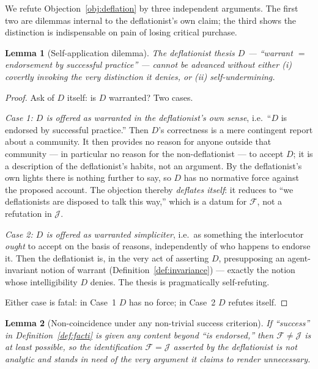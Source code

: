 \documentclass{amsart}
\theoremstyle{definition}
\theoremstyle{plain}
\newtheorem{lemma}{Lemma}
\begin{document}
We refute Objection~\ref{obj:deflation} by three independent arguments. The
first two are dilemmas internal to the deflationist's own claim; the third
shows the distinction is indispensable on pain of losing critical purchase.

\begin{lemma}[Self-application dilemma]\label{lem:selfapp}
The deflationist thesis $D$ --- ``warrant $=$ endorsement by successful
practice'' --- cannot be advanced without either (i) covertly invoking the very
distinction it denies, or (ii) self-undermining.
\end{lemma}

\begin{proof}
Ask of $D$ itself: is $D$ warranted? Two cases.

\emph{Case 1: $D$ is offered as warranted in the deflationist's own sense}, i.e.\
``$D$ is endorsed by successful practice.'' Then $D$'s correctness is a mere
contingent report about a community. It then provides no reason for anyone
outside that community --- in particular no reason for the non-deflationist ---
to accept $D$; it is a description of the deflationist's habits, not an argument.
By the deflationist's own lights there is nothing further to say, so $D$ has no
normative force against the proposed account. The objection thereby
\emph{deflates itself}: it reduces to ``we deflationists are disposed to talk
this way,'' which is a datum for $\mathcal{F}$, not a refutation in
$\mathcal{J}$.

\emph{Case 2: $D$ is offered as warranted simpliciter}, i.e.\ as something the
interlocutor \emph{ought} to accept on the basis of reasons, independently of
who happens to endorse it. Then the deflationist is, in the very act of
asserting $D$, presupposing an agent-invariant notion of warrant
(Definition~\ref{def:invariance}) --- exactly the notion whose intelligibility
$D$ denies. The thesis is pragmatically self-refuting.

Either case is fatal: in Case~1 $D$ has no force; in Case~2 $D$ refutes itself.
\end{proof}

\begin{lemma}[Non-coincidence under any non-trivial success criterion]
\label{lem:noncoincide}
If ``success'' in Definition~\ref{def:facti} is given any content beyond ``is
endorsed,'' then $\mathcal{F} \neq \mathcal{J}$ is at least possible, so the
identification $\mathcal{F}=\mathcal{J}$ asserted by the deflationist is not
analytic and stands in need of the very argument it claims to render
unnecessary.
\end{lemma}
\end{document}
